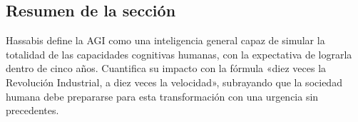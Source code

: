 \subsection{Resumen de la sección}

Hassabis define la AGI como una inteligencia general capaz de simular la totalidad de las capacidades cognitivas humanas, con la expectativa de lograrla dentro de cinco años. Cuantifica su impacto con la fórmula «diez veces la Revolución Industrial, a diez veces la velocidad», subrayando que la sociedad humana debe prepararse para esta transformación con una urgencia sin precedentes.

